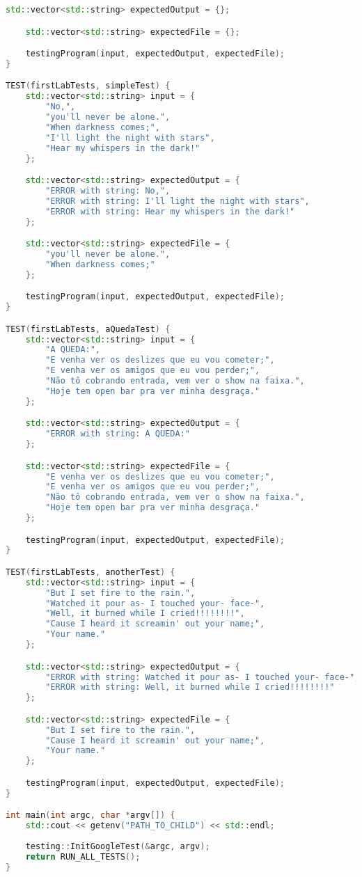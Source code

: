 \documentclass[a4paper, 12pt]{article}
\begin{document}
\begin{lstlisting}[language=C++]
    std::vector<std::string> expectedOutput = {};

    std::vector<std::string> expectedFile = {};

    testingProgram(input, expectedOutput, expectedFile);
}

TEST(firstLabTests, simpleTest) {
    std::vector<std::string> input = {
        "No,",
        "you'll never be alone.",
        "When darkness comes;",
        "I'll light the night with stars",
        "Hear my whispers in the dark!"
    };

    std::vector<std::string> expectedOutput = {
        "ERROR with string: No,",
        "ERROR with string: I'll light the night with stars",
        "ERROR with string: Hear my whispers in the dark!"
    };

    std::vector<std::string> expectedFile = {
        "you'll never be alone.",
        "When darkness comes;"
    };

    testingProgram(input, expectedOutput, expectedFile);
}

TEST(firstLabTests, aQuedaTest) {
    std::vector<std::string> input = {
        "A QUEDA:",
        "E venha ver os deslizes que eu vou cometer;",
        "E venha ver os amigos que eu vou perder;",
        "Não tô cobrando entrada, vem ver o show na faixa.",
        "Hoje tem open bar pra ver minha desgraça."
    };

    std::vector<std::string> expectedOutput = {
        "ERROR with string: A QUEDA:"
    };

    std::vector<std::string> expectedFile = {
        "E venha ver os deslizes que eu vou cometer;",
        "E venha ver os amigos que eu vou perder;",
        "Não tô cobrando entrada, vem ver o show na faixa.",
        "Hoje tem open bar pra ver minha desgraça."
    };

    testingProgram(input, expectedOutput, expectedFile);
}

TEST(firstLabTests, anotherTest) {
    std::vector<std::string> input = {
        "But I set fire to the rain.",
        "Watched it pour as- I touched your- face-",
        "Well, it burned while I cried!!!!!!!!",
        "Cause I heard it screamin' out your name;",
        "Your name."
    };

    std::vector<std::string> expectedOutput = {
        "ERROR with string: Watched it pour as- I touched your- face-",
        "ERROR with string: Well, it burned while I cried!!!!!!!!"
    };

    std::vector<std::string> expectedFile = {
        "But I set fire to the rain.",
        "Cause I heard it screamin' out your name;",
        "Your name."
    };    

    testingProgram(input, expectedOutput, expectedFile);
}

int main(int argc, char *argv[]) {
    std::cout << getenv("PATH_TO_CHILD") << std::endl;
    
    testing::InitGoogleTest(&argc, argv);
    return RUN_ALL_TESTS();
}
\end{lstlisting}
\end{document}
